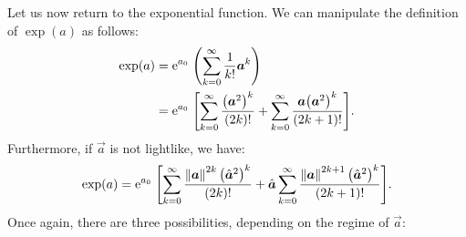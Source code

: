 Let us now return to the exponential function. We can manipulate the definition of $\exp(a)$ as follows:
\begin{equation*}
    \begin{split}
        \exp(a) &= \ec^{a_0}\;\qty(\sum_{k=0}^\infty \frac{1}{k!} \vec{a}^k) \\
                &= \ec^{a_0}\;\qty[\sum_{k=0}^\infty \frac{\qty(\vec{a}^2)^k}{(2k)!}  + \sum_{k=0}^\infty \frac{\vec{a}\qty(\vec{a}^2)^k}{(2k+1)!}]. \\
    \end{split}
\end{equation*}
Furthermore, if $\vec{a}$ is not lightlike, we have:
\begin{equation*}
    \exp(a) = \ec^{a_0}\;\qty[\sum_{k=0}^\infty \frac{\norm{\vec{a}}^{2k}\, \qty(\uvec{a}^2)^k}{(2k)!}  + \uvec{a}\sum_{k=0}^\infty \frac{\norm{\vec{a}}^{2k+1} \, \qty(\uvec{a}^2)^k}{(2k+1)!}].
\end{equation*}
Once again, there are three possibilities, depending on the regime of $\vec{a}$:
